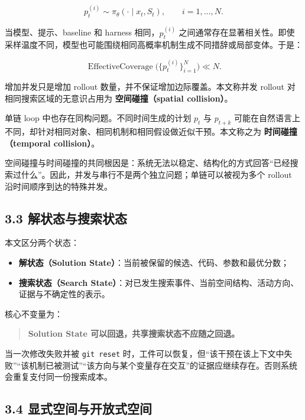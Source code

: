 \documentclass[
  11pt]{ctexart}
\providecommand{\tightlist}{%
  \setlength{\itemsep}{0pt}\setlength{\parskip}{0pt}}
\begin{document}
\[
p_t^{(i)} \sim \pi_\theta(\cdot \mid x_t,S_t), \qquad i=1,\ldots,N.
\]

当模型、提示、baseline 和 harness 相同，\(p_t^{(i)}\)
之间通常存在显著相关性。即使采样温度不同，模型也可能围绕相同高概率机制生成不同措辞或局部变体。于是：

\[
\operatorname{EffectiveCoverage}
\bigl(\{p_t^{(i)}\}_{i=1}^{N}\bigr)
\ll N.
\]

增加并发只是增加 rollout 数量，并不保证增加边际覆盖。本文称并发 rollout
对相同搜索区域的无意识占用为 \textbf{空间碰撞（spatial collision）}。

单链 loop 中也存在同构问题。不同时间生成的计划 \(p_t\) 与 \(p_{t+k}\)
可能在自然语言上不同，却针对相同对象、相同机制和相同假设做近似干预。本文称之为
\textbf{时间碰撞（temporal collision）}。

空间碰撞与时间碰撞的共同根因是：系统无法以稳定、结构化的方式回答``已经搜索过什么''。因此，并发与串行不是两个独立问题；单链可以被视为多个
rollout 沿时间顺序到达的特殊并发。

\subsection{3.3
解状态与搜索状态}\label{ux89e3ux72b6ux6001ux4e0eux641cux7d22ux72b6ux6001}

本文区分两个状态：

\begin{itemize}
\tightlist
\item
  \textbf{解状态（Solution
  State）}：当前被保留的候选、代码、参数和最优分数；
\item
  \textbf{搜索状态（Search
  State）}：对已发生搜索事件、当前空间结构、活动方向、证据与不确定性的表示。
\end{itemize}

核心不变量为：

\begin{quote}
\textbf{Solution State 可以回退，共享搜索状态不应随之回退。}
\end{quote}

当一次修改失败并被 \texttt{git\ reset}
时，工件可以恢复，但``该干预在该上下文中失败''``该机制已被测试''``该方向与某个变量存在交互''的证据应继续存在。否则系统会重复支付同一份搜索成本。

\subsection{3.4
显式空间与开放式空间}\label{ux663eux5f0fux7a7aux95f4ux4e0eux5f00ux653eux5f0fux7a7aux95f4}
\end{document}
